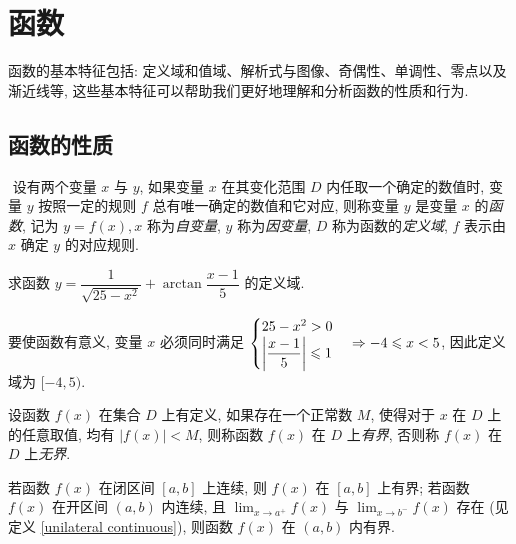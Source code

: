 \section{函数}

函数的基本特征包括: 定义域和值域、解析式与图像、奇偶性、单调性、零点以及渐近线等, 这些基本特征可以帮助我们更好地理解和分析函数的性质和行为.

\subsection{函数的性质}

\begin{definition}[函数的概念]
    $  $ 设有两个变量 $ x $ 与 $ y $, 如果变量 $ x $ 在其变化范围 $ D $ 内任取一个确定的数值时, 变量 $ y $ 按照一定的规则 $ f $ 总有唯一确定的数值和它对应, 则称变量 $ y $ 是变量 $ x $ 的\textit{函数}, 记为 $ y=f(x), x $ 称为\textit{自变量}, $ y $ 称为\textit{因变量}, $ D $ 称为函数的\textit{定义域}, $ f $ 表示由 $ x $ 确定 $ y $ 的对应规则.
\end{definition}

\begin{example}
    求函数 $y=\dfrac{1}{\sqrt{25-x^2}}+\arctan\dfrac{x-1}{5}$ 的定义域.
\end{example}
\begin{solution}
    要使函数有意义, 变量 $x$ 必须同时满足 $\begin{cases}
        25-x^2>0\\\qty|\dfrac{x-1}{5}|\leqslant 1
    \end{cases}\Rightarrow -4\leqslant x<5$, 因此定义域为 $[-4,5).$
\end{solution}

\begin{definition}[有界性]
    设函数 $ f(x) $ 在集合 $ D $ 上有定义, 如果存在一个正常数 $ M $, 使得对于 $ x$ 在 $ D $ 上的任意取值, 均有 $ |f(x)|<M $, 则称函数 $ f(x) $ 在 $ D $ 上\textit{有界}, 否则称 $ f(x) $ 在 $ D $ 上\textit{无界}.
\end{definition}

\begin{theorem}[函数的有界性定理]
    若函数 $f(x)$ 在闭区间 $[a,b]$ 上连续, 则 $f(x)$ 在 $[a,b]$ 上有界;
    若函数 $f(x)$ 在开区间 $(a,b)$ 内连续, 且 $\displaystyle\lim_{x\to a^+}f(x)$ 与 $\displaystyle\lim_{x\to b^-}f(x)$ 存在 (见定义 \ref{unilateral continuous}), 则函数 $f(x)$ 在 $(a,b)$ 内有界.
\end{theorem}

